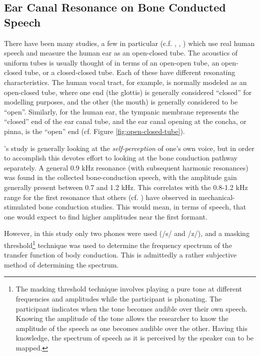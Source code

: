 \documentclass[dissertation,copyright]{uathesis}
\begin{document}
\subsection{Ear Canal Resonance on Bone Conducted Speech}

There have been many studies, a few in particular (c.f. \cite{bekesy:48}, \cite{porschmann:00}, \cite{reinfeldt:10}) which use real human speech and measure the human ear as an open-closed tube.
%
The acoustics of uniform tubes is usually thought of in terms of an open-open tube, an open-closed tube, or a closed-closed tube.  Each of these have different resonating characteristics. The human vocal tract, for example, is normally modeled as an open-closed tube, where one end (the glottis) is generally considered ``closed'' for modelling purposes, and the other (the mouth) is generally considered to be ``open''.  Similarly, for the human ear, the tympanic membrane represents the ``closed'' end of the ear canal tube, and the ear canal opening at the concha, or pinna, is the ``open'' end (cf. Figure \ref{fig:open-closed-tube}).

\cite{porschmann:00}'s study is generally looking at the \textit{self-perception} of one's own voice, but in order to accomplish this devotes effort to looking at the bone conduction pathway separately.  A general 0.9 kHz resonance (with subsequent harmonic resonances) was found in the collected bone-conduction speech, with the amplitude gain generally present between 0.7 and 1.2 kHz.  This correlates with the 0.8-1.2 kHz range for the first resonance that others  (cf. \cite{hakansson:94}) have observed in mechanical-stimulated bone conduction studies. This would mean, in terms of speech, that one would expect to find higher amplitudes near the first formant.

However, in this study only two phones were used (/s/ and /z/), and a masking threshold\footnote{The masking threshold technique involves playing a pure tone at different frequencies and amplitudes while the participant is phonating. The participant indicates when the tone becomes audible over their own speech. Knowing the amplitude of the tone allows the researcher to know the amplitude of the speech as one becomes audible over the other. Having this knowledge, the spectrum of speech as it is perceived by the speaker can to be mapped.} technique was used to determine the frequency spectrum of the transfer function of body conduction.  This is admittedly a rather subjective method of determining the spectrum.  
\end{document}
